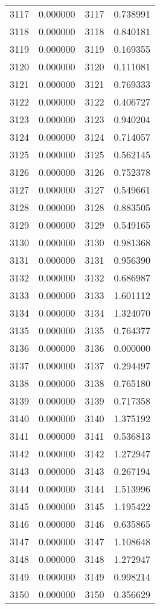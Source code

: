\documentclass[12pt]{article}
\begin{document}
\begin{longtable}{@{}cccc@{}}
3117 & 0.000000 & 3117 & 0.738991 \\
3118 & 0.000000 & 3118 & 0.840181 \\
3119 & 0.000000 & 3119 & 0.169355 \\
3120 & 0.000000 & 3120 & 0.111081 \\
3121 & 0.000000 & 3121 & 0.769333 \\
3122 & 0.000000 & 3122 & 0.406727 \\
3123 & 0.000000 & 3123 & 0.940204 \\
3124 & 0.000000 & 3124 & 0.714057 \\
3125 & 0.000000 & 3125 & 0.562145 \\
3126 & 0.000000 & 3126 & 0.752378 \\
3127 & 0.000000 & 3127 & 0.549661 \\
3128 & 0.000000 & 3128 & 0.883505 \\
3129 & 0.000000 & 3129 & 0.549165 \\
3130 & 0.000000 & 3130 & 0.981368 \\
3131 & 0.000000 & 3131 & 0.956390 \\
3132 & 0.000000 & 3132 & 0.686987 \\
3133 & 0.000000 & 3133 & 1.601112 \\
3134 & 0.000000 & 3134 & 1.324070 \\
3135 & 0.000000 & 3135 & 0.764377 \\
3136 & 0.000000 & 3136 & 0.000000 \\
3137 & 0.000000 & 3137 & 0.294497 \\
3138 & 0.000000 & 3138 & 0.765180 \\
3139 & 0.000000 & 3139 & 0.717358 \\
3140 & 0.000000 & 3140 & 1.375192 \\
3141 & 0.000000 & 3141 & 0.536813 \\
3142 & 0.000000 & 3142 & 1.272947 \\
3143 & 0.000000 & 3143 & 0.267194 \\
3144 & 0.000000 & 3144 & 1.513996 \\
3145 & 0.000000 & 3145 & 1.195422 \\
3146 & 0.000000 & 3146 & 0.635865 \\
3147 & 0.000000 & 3147 & 1.108648 \\
3148 & 0.000000 & 3148 & 1.272947 \\
3149 & 0.000000 & 3149 & 0.998214 \\
3150 & 0.000000 & 3150 & 0.356629 \\

\end{longtable}
\end{document}
